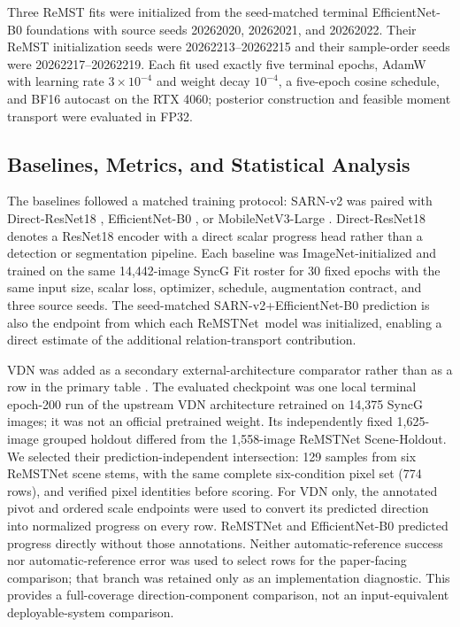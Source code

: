\documentclass[electronics,article,submit,oneauthor]{Definitions/mdpi}
\newcommand{\modelname}{ReMSTNet}
\begin{document}
Three ReMST fits were initialized from the seed-matched terminal EfficientNet-B0 foundations with source seeds 20262020, 20262021, and 20262022. Their ReMST initialization seeds were 20262213--20262215 and their sample-order seeds were 20262217--20262219. Each fit used exactly five terminal epochs, AdamW with learning rate $3\times10^{-4}$ and weight decay $10^{-4}$, a five-epoch cosine schedule, and BF16 autocast on the RTX 4060; posterior construction and feasible moment transport were evaluated in FP32.

\subsection{Baselines, Metrics, and Statistical Analysis}
\label{subsec:evaluation}

The baselines followed a matched training protocol: SARN-v2 was paired with Direct-ResNet18 \cite{he2016resnet}, EfficientNet-B0 \cite{tan2019efficientnet}, or MobileNetV3-Large \cite{howard2019mobilenetv3}. Direct-ResNet18 denotes a ResNet18 encoder with a direct scalar progress head rather than a detection or segmentation pipeline. Each baseline was ImageNet-initialized and trained on the same 14,442-image SyncG Fit roster for 30 fixed epochs with the same input size, scalar loss, optimizer, schedule, augmentation contract, and three source seeds. The seed-matched SARN-v2+EfficientNet-B0 prediction is also the endpoint from which each \modelname\ model was initialized, enabling a direct estimate of the additional relation-transport contribution.

VDN was added as a secondary external-architecture comparator rather than as a row in the primary table \cite{dong2021vdn}. The evaluated checkpoint was one local terminal epoch-200 run of the upstream VDN architecture retrained on 14,375 SyncG images; it was not an official pretrained weight. Its independently fixed 1,625-image grouped holdout differed from the 1,558-image ReMSTNet Scene-Holdout. We selected their prediction-independent intersection: 129 samples from six ReMSTNet scene stems, with the same complete six-condition pixel set (774 rows), and verified pixel identities before scoring. For VDN only, the annotated pivot and ordered scale endpoints were used to convert its predicted direction into normalized progress on every row. ReMSTNet and EfficientNet-B0 predicted progress directly without those annotations. Neither automatic-reference success nor automatic-reference error was used to select rows for the paper-facing comparison; that branch was retained only as an implementation diagnostic. This provides a full-coverage direction-component comparison, not an input-equivalent deployable-system comparison.
\end{document}
